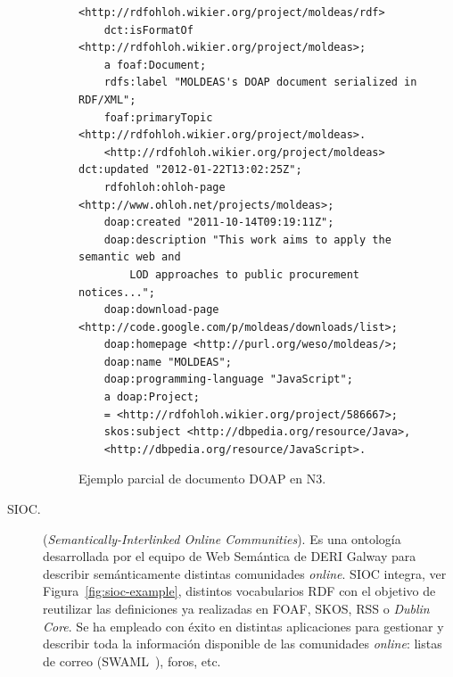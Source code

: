 \begin{description}
\begin{figure}[!htbp]
\centering
  \begin{lstlisting}
<http://rdfohloh.wikier.org/project/moldeas/rdf> 
	dct:isFormatOf 	<http://rdfohloh.wikier.org/project/moldeas>;
	a foaf:Document;
	rdfs:label "MOLDEAS's DOAP document serialized in RDF/XML";
	foaf:primaryTopic <http://rdfohloh.wikier.org/project/moldeas>.
	<http://rdfohloh.wikier.org/project/moldeas> dct:updated "2012-01-22T13:02:25Z";
	rdfohloh:ohloh-page <http://www.ohloh.net/projects/moldeas>;
	doap:created "2011-10-14T09:19:11Z";
	doap:description "This work aims to apply the semantic web and 
	    LOD approaches to public procurement notices...";
	doap:download-page <http://code.google.com/p/moldeas/downloads/list>;
	doap:homepage <http://purl.org/weso/moldeas/>;
	doap:name "MOLDEAS";
	doap:programming-language "JavaScript";
	a doap:Project;
	= <http://rdfohloh.wikier.org/project/586667>;
	skos:subject <http://dbpedia.org/resource/Java>, 
	<http://dbpedia.org/resource/JavaScript>.
  \end{lstlisting}
\caption{Ejemplo parcial de documento DOAP en N3.}
\label{fig:doap-example}
\end{figure}

\newpage

\item[\gls{SIOC}.] (\textit{Semantically-Interlinked Online Communities}). Es una ontología desarrollada 
por el equipo de Web Semántica de DERI Galway para describir semánticamente
distintas comunidades \textit{online}. SIOC integra, ver Figura~\ref{fig:sioc-example}, distintos vocabularios RDF con el
objetivo de reutilizar las definiciones ya realizadas en \gls{FOAF}, \gls{SKOS},
\gls{RSS} o \textit{Dublin Core}. Se ha empleado con éxito en distintas aplicaciones para gestionar y
describir toda la información disponible de las comunidades \textit{online}: listas de correo (SWAML~\cite{Sergio}), 
foros, etc.
 


\end{description}
